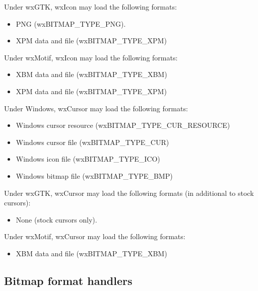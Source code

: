 Under wxGTK, wxIcon may load the following formats:

\begin{itemize}\itemsep=0pt
\item PNG (wxBITMAP\_TYPE\_PNG).
\item XPM data and file (wxBITMAP\_TYPE\_XPM)
\end{itemize}

Under wxMotif, wxIcon may load the following formats:

\begin{itemize}\itemsep=0pt
\item XBM data and file (wxBITMAP\_TYPE\_XBM)
\item XPM data and file (wxBITMAP\_TYPE\_XPM)
\end{itemize}


Under Windows, wxCursor may load the following formats:

\begin{itemize}\itemsep=0pt
\item Windows cursor resource (wxBITMAP\_TYPE\_CUR\_RESOURCE)
\item Windows cursor file (wxBITMAP\_TYPE\_CUR)
\item Windows icon file (wxBITMAP\_TYPE\_ICO)
\item Windows bitmap file (wxBITMAP\_TYPE\_BMP)
\end{itemize}

Under wxGTK, wxCursor may load the following formats (in additional
to stock cursors):

\begin{itemize}\itemsep=0pt
\item None (stock cursors only).
\end{itemize}

Under wxMotif, wxCursor may load the following formats:

\begin{itemize}\itemsep=0pt
\item XBM data and file (wxBITMAP\_TYPE\_XBM)
\end{itemize}

\subsection{Bitmap format handlers}\label{bitmaphandlers}

